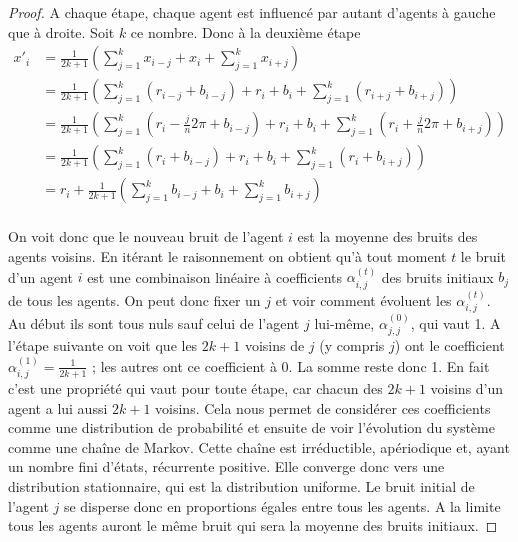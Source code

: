 \documentclass[a4paper,10pt]{article}
\begin{document}
\begin{proof}
A chaque étape, chaque agent est influencé par autant d'agents à gauche que à droite. Soit $k$ ce nombre. Donc à la deuxième étape
\begin{equation*}
\begin{split}
x'_i &= \frac{1}{2k+1} \left( \sum_{j=1}^k x_{i-j} + x_i + \sum_{j=1}^k x_{i+j} \right) \\
     &= \frac{1}{2k+1} \left( \sum_{j=1}^k (r_{i-j} + b_{i-j}) + r_i + b_i + \sum_{j=1}^k (r_{i+j} + b_{i+j}) \right) \\
     &= \frac{1}{2k+1} \left( \sum_{j=1}^k (r_i - \frac{j}{n}2 \pi + b_{i-j}) + r_i + b_i + \sum_{j=1}^k (r_i + \frac{j}{n}2 \pi + b_{i+j}) \right) \\
     &= \frac{1}{2k+1} \left( \sum_{j=1}^k (r_i + b_{i-j}) + r_i + b_i + \sum_{j=1}^k (r_i + b_{i+j}) \right) \\
     &= r_i + \frac{1}{2k+1} \left( \sum_{j=1}^k b_{i-j} + b_i + \sum_{j=1}^k b_{i+j} \right) \\
\end{split}
\end{equation*}

On voit donc que le nouveau bruit de l'agent $i$ est la moyenne des bruits des agents voisins. En itérant le raisonnement on obtient qu'à tout moment $t$ le bruit d'un agent $i$ est une combinaison linéaire à coefficients $\alpha_{i,j}^{(t)}$ des bruits initiaux $b_j$ de tous les agents. On peut donc fixer un $j$ et voir comment évoluent les $\alpha_{i,j}^{(t)}$. Au début ils sont tous nuls sauf celui de l'agent $j$ lui-même, $\alpha_{j,j}^{(0)}$, qui vaut 1. A l’étape suivante on voit que les $2k+1$ voisins de $j$ (y compris $j$) ont le coefficient $\alpha_{i,j}^{(1)}=\frac{1}{2k+1}$ ; les autres ont ce coefficient à 0. La somme reste donc 1. En fait c'est une propriété qui vaut pour toute étape, car chacun des $2k+1$ voisins d'un agent a lui aussi $2k+1$ voisins. Cela nous permet de considérer ces coefficients comme une distribution de probabilité et ensuite de voir l’évolution du système comme une chaîne de Markov. Cette chaîne est irréductible, apériodique et, ayant un nombre fini d'états, récurrente positive. Elle converge donc vers une distribution stationnaire, qui est la distribution uniforme. Le bruit initial de l'agent $j$ se disperse donc en proportions égales entre tous les agents. A la limite tous les agents auront le même bruit qui sera la moyenne des bruits initiaux.
\end{proof}
\end{document}
